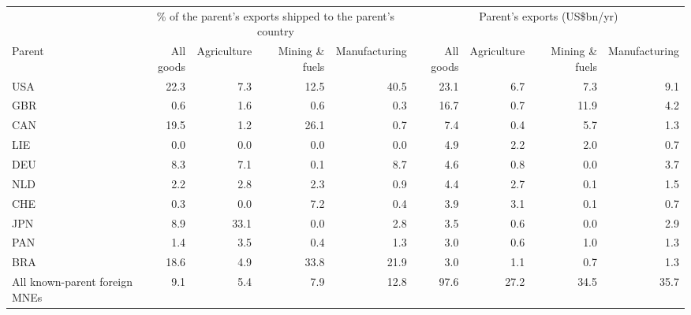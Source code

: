 \begin{tabular}{lrrrrrrrr}
\toprule
 & \multicolumn{4}{c}{\% of the parent's exports shipped to the parent's country} & \multicolumn{4}{c}{Parent's exports (US\$bn/yr)} \\
Parent & All goods & Agriculture & Mining \& fuels & Manufacturing & All goods & Agriculture & Mining \& fuels & Manufacturing \\
\midrule
USA & 22.3 & 7.3 & 12.5 & 40.5 & 23.1 & 6.7 & 7.3 & 9.1 \\
GBR & 0.6 & 1.6 & 0.6 & 0.3 & 16.7 & 0.7 & 11.9 & 4.2 \\
CAN & 19.5 & 1.2 & 26.1 & 0.7 & 7.4 & 0.4 & 5.7 & 1.3 \\
LIE & 0.0 & 0.0 & 0.0 & 0.0 & 4.9 & 2.2 & 2.0 & 0.7 \\
DEU & 8.3 & 7.1 & 0.1 & 8.7 & 4.6 & 0.8 & 0.0 & 3.7 \\
NLD & 2.2 & 2.8 & 2.3 & 0.9 & 4.4 & 2.7 & 0.1 & 1.5 \\
CHE & 0.3 & 0.0 & 7.2 & 0.4 & 3.9 & 3.1 & 0.1 & 0.7 \\
JPN & 8.9 & 33.1 & 0.0 & 2.8 & 3.5 & 0.6 & 0.0 & 2.9 \\
PAN & 1.4 & 3.5 & 0.4 & 1.3 & 3.0 & 0.6 & 1.0 & 1.3 \\
BRA & 18.6 & 4.9 & 33.8 & 21.9 & 3.0 & 1.1 & 0.7 & 1.3 \\
\midrule
All known-parent foreign MNEs & 9.1 & 5.4 & 7.9 & 12.8 & 97.6 & 27.2 & 34.5 & 35.7 \\
\bottomrule
\end{tabular}
